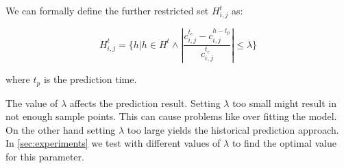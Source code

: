 We can formally define the further restricted set $H_{i,j}^t$ as:

\begin{equation}
H_{i,j}^t = \{h|h \in H^t \wedge \left| \frac{c_{i,j}^{t_c} - c_{i,j}^{h-t_p}}{c_{i,j}^{t_c}} \right| \leq \lambda \}  
\end{equation}

where $t_p$ is the prediction time.

The value of $\lambda$ affects the prediction result. Setting $\lambda$ too small might result in not enough sample points. This can cause problems like over fitting the model. On the other hand setting $\lambda$ too large yields the historical prediction approach. In \cref{sec:experiments} we test with different values of $\lambda$ to find the optimal value for this parameter. 


